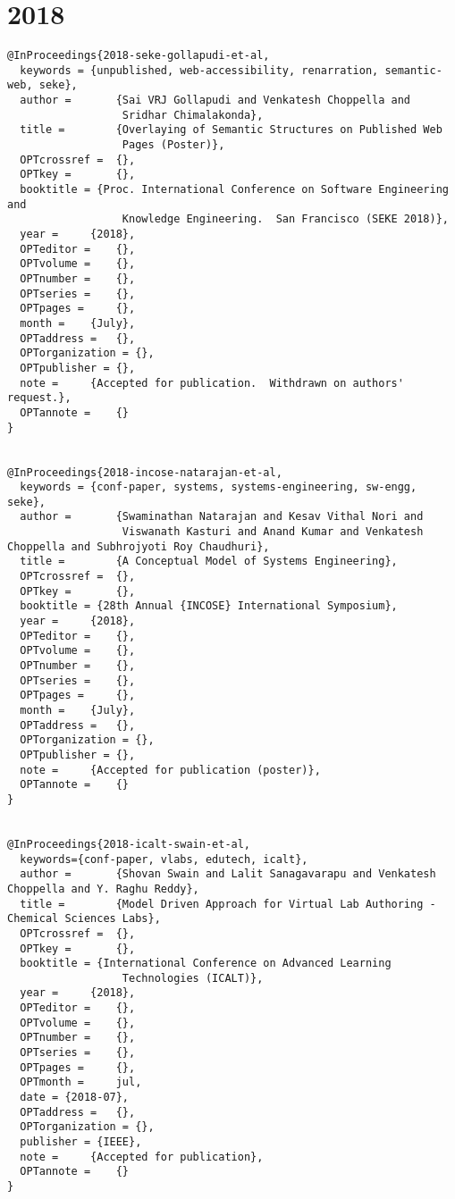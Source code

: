 \documentclass[11pt]{article}
\begin{document}
\section{2018}
\label{sec:orgfc35641}
\lstset{language=bibtex,label= ,caption= ,captionpos=b,numbers=none}
\begin{lstlisting}
@InProceedings{2018-seke-gollapudi-et-al,
  keywords = {unpublished, web-accessibility, renarration, semantic-web, seke},
  author = 		 {Sai VRJ Gollapudi and Venkatesh Choppella and
                  Sridhar Chimalakonda},
  title = 		 {Overlaying of Semantic Structures on Published Web
                  Pages (Poster)},
  OPTcrossref =  {},
  OPTkey = 		 {},
  booktitle = {Proc. International Conference on Software Engineering and
                  Knowledge Engineering.  San Francisco (SEKE 2018)},
  year = 	 {2018},
  OPTeditor = 	 {},
  OPTvolume = 	 {},
  OPTnumber = 	 {},
  OPTseries = 	 {},
  OPTpages = 	 {},
  month = 	 {July},
  OPTaddress = 	 {},
  OPTorganization = {},
  OPTpublisher = {},
  note = 	 {Accepted for publication.  Withdrawn on authors' request.},
  OPTannote = 	 {}
}


@InProceedings{2018-incose-natarajan-et-al,
  keywords = {conf-paper, systems, systems-engineering, sw-engg, seke},
  author = 		 {Swaminathan Natarajan and Kesav Vithal Nori and
                  Viswanath Kasturi and Anand Kumar and Venkatesh Choppella and Subhrojyoti Roy Chaudhuri},
  title = 		 {A Conceptual Model of Systems Engineering},
  OPTcrossref =  {},
  OPTkey = 		 {},
  booktitle = {28th Annual {INCOSE} International Symposium},
  year = 	 {2018},
  OPTeditor = 	 {},
  OPTvolume = 	 {},
  OPTnumber = 	 {},
  OPTseries = 	 {},
  OPTpages = 	 {},
  month = 	 {July},
  OPTaddress = 	 {},
  OPTorganization = {},
  OPTpublisher = {},
  note = 	 {Accepted for publication (poster)},
  OPTannote = 	 {}
}


@InProceedings{2018-icalt-swain-et-al,
  keywords={conf-paper, vlabs, edutech, icalt},
  author = 		 {Shovan Swain and Lalit Sanagavarapu and Venkatesh Choppella and Y. Raghu Reddy},
  title = 		 {Model Driven Approach for Virtual Lab Authoring - Chemical Sciences Labs},
  OPTcrossref =  {},
  OPTkey = 		 {},
  booktitle = {International Conference on Advanced Learning
                  Technologies (ICALT)},
  year = 	 {2018},
  OPTeditor = 	 {},
  OPTvolume = 	 {},
  OPTnumber = 	 {},
  OPTseries = 	 {},
  OPTpages = 	 {},
  OPTmonth = 	 jul,
  date = {2018-07},  
  OPTaddress = 	 {},
  OPTorganization = {},
  publisher = {IEEE},
  note = 	 {Accepted for publication},
  OPTannote = 	 {}
} 


\end{lstlisting}
\end{document}
